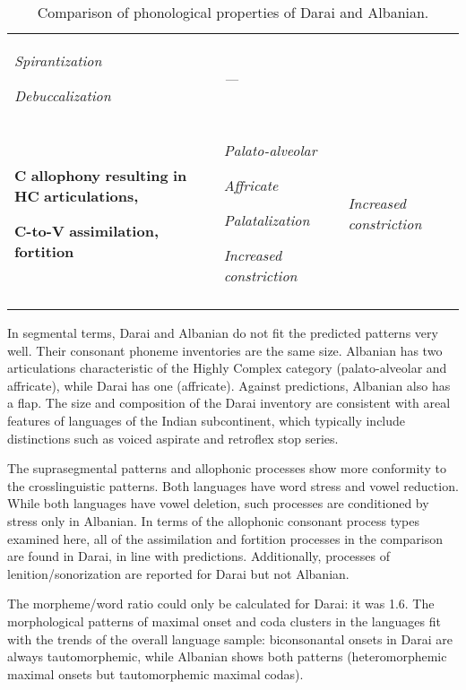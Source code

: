 \begin{table}
\begin{tabularx}{\textwidth}{XXX}
{ \textit{Spirantization}}

 \textit{Debuccalization} & \textit{—}\\
{ \textbf{C} \textbf{allophony} \textbf{resulting} \textbf{in} \textbf{HC} \textbf{articulations,} }

 \textbf{C-to-V} \textbf{assimilation,} \textbf{fortition} & { \textit{Palato-alveolar}}

{ \textit{Affricate}}

{ \textit{Palatalization}}

 \textit{Increased} \textit{constriction} & \textit{Increased} \textit{constriction}\\
\lspbottomrule
\end{tabularx}
\caption{\label{8.6}Comparison of phonological properties of Darai and Albanian.}
\end{table}

  In segmental terms, Darai and Albanian do not fit the predicted patterns very well. Their consonant phoneme inventories are the same size. Albanian has two articulations characteristic of the Highly Complex category (palato-alveolar and affricate), while Darai has one (affricate). Against predictions, Albanian also has a flap. The size and composition of the Darai inventory are consistent with areal features of languages of the Indian subcontinent, which typically include distinctions such as voiced aspirate and retroflex stop series.

  The suprasegmental patterns and allophonic processes show more conformity to the crosslinguistic patterns. Both languages have word stress and vowel reduction. While both languages have vowel deletion, such processes are conditioned by stress only in Albanian. In terms of the allophonic consonant process types examined here, all of the assimilation and fortition processes in the comparison are found in Darai, in line with predictions. Additionally, processes of lenition/sonorization are reported for Darai but not Albanian.

  The morpheme/word ratio could only be calculated for Darai: it was 1.6. The morphological patterns of maximal onset and coda clusters in the languages fit with the trends of the overall language sample: biconsonantal onsets in Darai are always tautomorphemic, while Albanian shows both patterns (heteromorphemic maximal onsets but tautomorphemic maximal codas).


